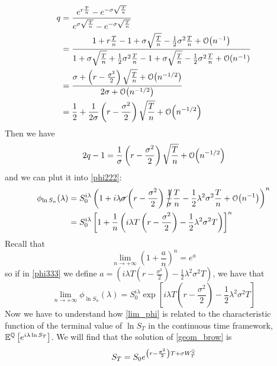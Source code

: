 \begin{align}
    \notag q 
    &=
    \dfrac{e^{r\frac{T}{n}}-e^{-\sigma\sqrt{\frac{T}{n}}}}{e^{\sigma\sqrt{\frac{T}{n}}}-e^{-\sigma\sqrt{\frac{T}{n}}}} \\
    &= 
    \notag \dfrac{1+r\frac{T}{n}-1+\sigma\sqrt{\frac{T}{n}}-\frac{1}{2}\sigma^2\frac{T}{n}+\order{n^{-1}}}{1+\sigma\sqrt{\frac{T}{n}}+\frac{1}{2}\sigma^2\frac{T}{n}-1+\sigma\sqrt{\frac{T}{n}}-\frac{1}{2}\sigma^2\frac{T}{n}+\order{n^{-1}}} \\
    &=
    \notag \dfrac{\sigma+\left(r-\frac{\sigma^2}{2}\right)\sqrt{\frac{T}{n}}+\order{n^{-1/2}}}{2\sigma+\order{n^{-1/2}}} \\
    &=
    \frac{1}{2}+\dfrac{1}{2\sigma}\left(r-\frac{\sigma^2}{2}\right)\sqrt{\frac{T}{n}}+\order{n^{-1/2}}
\end{align}
Then we have
\begin{equation}
    2q-1 = \dfrac{1}{\sigma}\left(r-\frac{\sigma^2}{2}\right)\sqrt{\frac{T}{n}}+\order{n^{-1/2}}
\end{equation}
and we can plut it into \eqref{phi222}:
\begin{align}\label{phi333}
    \notag \phi_{\ln S_n}(\lambda) 
    &=
    \notag S_0^{i\lambda}\left(1+i\lambda\cancel{\sigma}\left(r-\frac{\sigma^2}{2}\right)\cancel{\frac{1}{\sigma}}\frac{T}{n}-\frac{1}{2}\lambda^2\sigma^2\frac{T}{n}+\order{n^{-1}}\right)^n \\
    &= 
    S_0^{i\lambda}\left[1+\frac{1}{n}\left(
    i\lambda T\left(r-\frac{\sigma^2}{2}\right)-\frac{1}{2}\lambda^2\sigma^2 T\right)\right]^n
\end{align}
Recall that 
\begin{equation*}
    \lim_{n\to+\infty}\left(1+\dfrac{a}{n}\right)^n = e^a
\end{equation*}
so if in \eqref{phi333} we define $a = \left(i\lambda T\left(r-\frac{\sigma^2}{2}\right)-\frac{1}{2}\lambda^2\sigma^2 T\right)$, we have that 
\begin{equation}\label{lim_phi}
    \lim_{n\to+\infty} \phi_{\ln S_n}(\lambda) = S_0^{i\lambda}\exp\left[i\lambda T \left(r-\frac{\sigma^2}{2}\right)-\frac{1}{2}\lambda^2\sigma^2 T \right]
\end{equation} 
Now we have to understand how \eqref{lim_phi} is related to the characteristic function of the terminal value of $\ln S_T$ in the continuous time framework, $\mathbb{E}^{\mathbb{Q}}\left[e^{i\lambda\ln S_T}\right]$. We will find that the solution of \eqref{geom_brow} is 
\begin{equation}
    S_T = S_0e^{\left(r-\frac{\sigma^2}{2}\right)T+\sigma W_T^{\mathbb{Q}}}
\end{equation}

